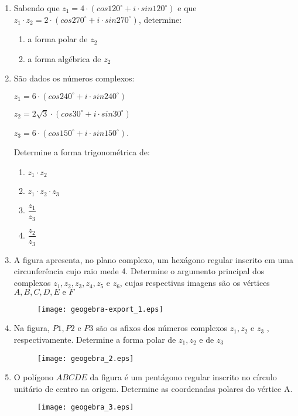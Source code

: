 \documentclass[a4paper, 11pt]{article}
\begin{document}
\begin{enumerate}
\item Sabendo que $z_1 = 4\cdot(cos120^{\circ} + i\cdot sin120^{\circ})$ e que $z_1\cdot z_2 = 2\cdot(cos270^{\circ} + i\cdot sin270^{\circ})$, determine:
	\begin{enumerate}
	\item a forma polar de $z_2$
	\item a forma algébrica de $z_2$
	\end{enumerate}

\item São dados os números complexos:

$z_1 = 6\cdot(cos240^{\circ} + i\cdot sin240^{\circ})$

$z_2 = 2\sqrt{3}\cdot(cos30^{\circ} + i\cdot sin30^{\circ})$

$z_3 = 6\cdot(cos150^{\circ} + i\cdot sin150^{\circ})$.

Determine a forma trigonométrica de:
	\begin{enumerate}
	\item $z_1 \cdot z_2$
	\item $z_1 \cdot z_2 \cdot z_3$
	\item $\dfrac{z_1}{z_3}$
	\item $\dfrac{z_2}{z_3}$
	\end{enumerate}
	
\item A figura apresenta, no plano complexo, um hexágono regular inscrito em uma circunferência cujo raio mede 4. Determine o argumento principal dos complexos $z_1, z_2, z_3, z_4, z_5 \textrm{ e } z_6$, cujas respectivas imagens são os vértices $A, B, C, D, E \textrm{ e } F$
	\begin{figure}[h]
	\centering
	\texttt{[image: geogebra-export\_1.eps]}
	\end{figure}

\item Na figura, $P1, P2 \textrm{ e } P3$ são os afixos dos números complexos $z_1, z_2 \textrm{ e } z_3$ , respectivamente. Determine a forma polar de $z_1, z_2 \textrm{ e de } z_3$
	\begin{figure}[h]
	\centering
	\texttt{[image: geogebra\_2.eps]}
	\end{figure}

\item O polígono $ABCDE$ da figura é um pentágono regular inscrito no círculo unitário de centro na origem. Determine as coordenadas polares do vértice A.
	\begin{figure}[!h]
	\centering
	\texttt{[image: geogebra\_3.eps]}
	\end{figure}


\end{enumerate}
\end{document}
